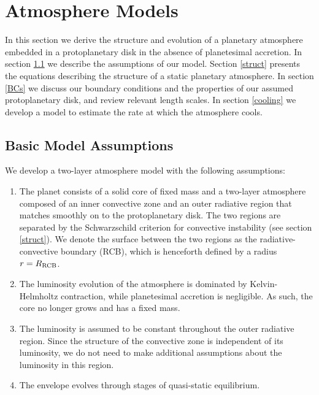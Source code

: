 \documentclass[apj]{emulateapj}
\newcommand{\cb}{_{\rm RCB}}
\begin{document}
\section{Atmosphere Models}
\label{sec2}

In this section we derive the structure and evolution of a planetary atmosphere embedded in a protoplanetary disk in the absence of planetesimal accretion. In section \ref{model} we describe the assumptions of our model. Section \ref{struct} presents the equations describing the structure of a static planetary atmosphere.  In section \ref{BCs} we discuss our boundary conditions and the properties of our assumed protoplanetary disk, and review relevant length scales.  In section \ref{cooling} we develop a model to estimate the rate at which the atmosphere cools. %

\subsection{Basic Model Assumptions}
\label{model}

We develop a two-layer atmosphere model with the following assumptions:

\begin{enumerate}
\item The planet consists of a solid core of fixed mass and a two-layer atmosphere composed of an inner convective zone and an outer radiative region that matches smoothly on to the protoplanetary disk. The two regions are separated by the Schwarzschild criterion for convective instability (see section \ref{struct}). We denote the surface between the two regions as the radiative-convective boundary (RCB), which is henceforth defined by a radius $r=R\cb$.
\item The luminosity evolution of the atmosphere is dominated by Kelvin-Helmholtz contraction, while planetesimal accretion is negligible. As such, the core no longer grows and has a fixed mass.
\item The luminosity is assumed to be constant throughout the outer radiative region. Since the structure of the convective zone is independent of its luminosity, we do not need to make additional assumptions about the luminosity in this region.
\item The envelope evolves through stages of quasi-static equilibrium.
\end{enumerate} 
\end{document}
